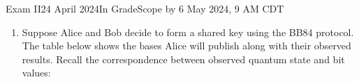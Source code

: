 \documentclass[12pt]{article}
\def\Gate#1{\mbox{\textbf{#1}}}
\def\Z{\Gate{Z}}
\newcommand{\Blank}[1][1in]{\mbox{\vrule width #1 depth 2pt}\vrule width 0pt height 2.2em}
\begin{document}
\begin{assignment}{Exam II}{24 April 2024}{In GradeScope by 6 May 2024, 9 AM CDT}
\begin{enumerate}
\begin{enumerate}
\end{enumerate}
\clearpage
\item{} 
Suppose Alice and Bob decide to form a shared key using the BB84 protocol.  The table below shows the bases Alice will publish along with their observed results.   Recall the correspondence between observed quantum state and bit values:
\begin{BBKey}
\begin{center}
\BBBasis{}
\end{center}
\end{BBKey}
\def\RowU#1#2#3{%
\vrule width 0pt depth 0.5em height 1.2em#1 &#2 &  &  &  #3  \\ \hline}
\def\Row#1#2{%
\RowU{\STD}{#1}{#2}}
\def\RowX#1#2{%
\RowU{\HDM}{#1}{#2}}


\end{enumerate}
\end{assignment}
\end{document}
